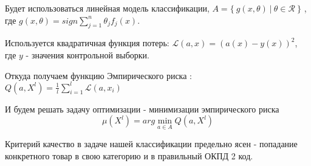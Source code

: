 \documentclass{article}
\begin{document}
Будет использоваться линейная модель классификации, $A = \{ \ g(x,\theta) \ | \ \theta \in \mathcal{R} \ \}$ , где $g(x, \theta) = sign \sum \limits_{j=1}^n \theta_j f_j(x)$.

Используется квадратичная функция потерь: $\mathcal{L}(a,x) = (a(x) - y(x))^2$, где $y$ - значения контрольной выборки.  

Откуда получаем функцию Эмпирического риска : $Q(a,X^l)=\frac{1}{l}\sum\limits^l_{i=1}\mathcal{L}(a,x_i)$

И будем решать задачу оптимизации - минимизации эмпирического риска 
$$ \mu(X^l) = arg \min_{a\in A} Q(a, X^l)$$


Критерий качество в задаче нашей классификации предельно ясен - попадание конкретного товар в свою категорию и в правильный ОКПД 2 код.



\end{document}

